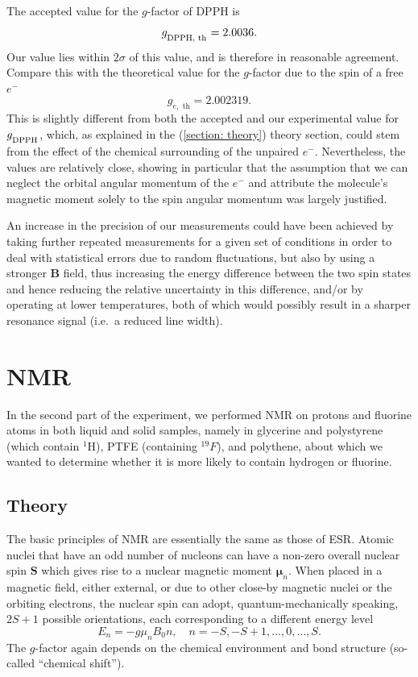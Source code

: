 \documentclass[a4paper]{jpconf}
\numberwithin{equation}{section}
\begin{document}
The accepted value for the $g$-factor of DPPH is
\[
	g_{\textsubscript{DPPH, th}} = 2.0036.
\]
Our value lies within $2\sigma$ of this value, and is therefore in reasonable agreement.
Compare this with the theoretical value for the $g$-factor due to the spin of a free $e^-$
\[
	g_{e,\text{ th}} = 2.002319.
\]
This is slightly different from both the accepted and our experimental value for $g_{\textsubscript{DPPH}}$, which, as explained in the (\ref{section: theory}) theory section, could stem from the effect of the chemical surrounding of the unpaired $e^-$. Nevertheless, the values are relatively close, showing in particular that the assumption that we can neglect the orbital angular momentum of the $e^-$ and attribute the molecule's magnetic moment solely to the spin angular momentum was largely justified.

An increase in the precision of our measurements could have been achieved by taking further repeated measurements for a given set of conditions in order to deal with statistical errors due to random fluctuations, but also by using a stronger $\mathbf{B}$ field, thus increasing the energy difference between the two spin states and hence reducing the relative uncertainty in this difference, and/or by operating at lower temperatures, both of which would possibly result in a sharper resonance signal (i.e.\ a reduced line width).


\section{NMR} 
In the second part of the experiment, we performed NMR on protons and fluorine atoms in both liquid and solid samples, namely in glycerine and polystyrene (which contain ${}^1$H), PTFE (containing ${}^{19}F$), and polythene, about which we wanted to determine whether it is more likely to contain hydrogen or fluorine.
\subsection{Theory}

The basic principles of NMR are essentially the same as those of ESR. Atomic nuclei that have an odd number of nucleons can have a non-zero overall nuclear spin $\mathbf{S}$ which gives rise to a nuclear magnetic moment $\bm{\mu}_n$. When placed in a magnetic field, either external, or due to other close-by magnetic nuclei or the orbiting electrons, the nuclear spin can adopt, quantum-mechanically speaking, $2S + 1$ possible orientations, each corresponding to a different energy level
\[
	E_n = -g \mu_n B_0 n, \quad n = -S, -S+1, \dots, 0, \dots, S. 
\] 
The $g$-factor again depends on the chemical environment and bond structure (so-called ``chemical shift''). 
\end{document}
